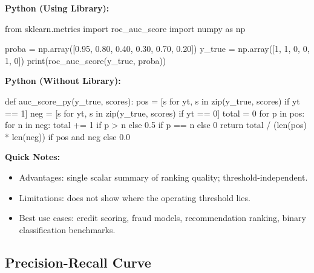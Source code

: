 \documentclass[11pt,a4paper]{article}
\newcommand{\pyheading}[1]{%
\vspace{2\baselineskip}
\noindent\textbf{#1}
}
\begin{document}

\pyheading{Python (Using Library):}

\begin{py}
from sklearn.metrics import roc_auc_score
import numpy as np

proba = np.array([0.95, 0.80, 0.40, 0.30, 0.70, 0.20])
y_true = np.array([1, 1, 0, 0, 1, 0])
print(roc_auc_score(y_true, proba))
\end{py}

\pyheading{Python (Without Library):}

\begin{py}
def auc_score_py(y_true, scores):
    pos = [s for yt, s in zip(y_true, scores) if yt == 1]
    neg = [s for yt, s in zip(y_true, scores) if yt == 0]
    total = 0
    for p in pos:
        for n in neg:
            total += 1 if p > n else 0.5 if p == n else 0
    return total / (len(pos) * len(neg)) if pos and neg else 0.0
\end{py}

\pyheading{Quick Notes:}
\begin{itemize}
\item Advantages: single scalar summary of ranking quality; threshold-independent.
\item Limitations: does not show where the operating threshold lies.
\item Best use cases: credit scoring, fraud models, recommendation ranking, binary classification benchmarks.
\end{itemize}

\subsection{Precision-Recall Curve}




\end{document}
